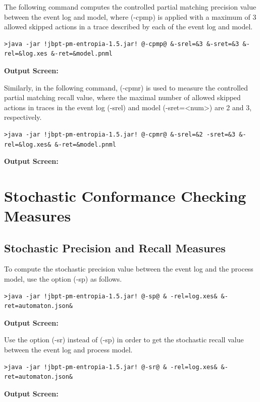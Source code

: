 \documentclass{article}
\begin{document}
The following command computes the controlled partial matching precision value between the event log and model, where (\textcolor{darkcandyapplered}{\footnotesize\ttfamily-cpmp}) is applied with a maximum of 3 allowed skipped actions in a trace described by each of the event log and model.
\begin{lstlisting}[style=CL]
>java -jar !jbpt-pm-entropia-1.5.jar! @-cpmp@ &-srel=&3 &-sret=&3 &-rel=&log.xes &-ret=&model.pnml
\end{lstlisting}
\textbf{Output Screen:}%


Similarly, in the following command, (\textcolor{darkcandyapplered}{\footnotesize\ttfamily-cpmr}) is used to measure the  controlled partial matching recall value, where the maximal number of allowed skipped actions in traces in the event log (\textcolor{ao}{\footnotesize\ttfamily-srel}) and model (\textcolor{ao}{\footnotesize\ttfamily-sret=<num>}) are 2 and 3, respectively.
\begin{lstlisting}[style=CL]
>java -jar !jbpt-pm-entropia-1.5.jar! @-cpmr@ &-srel=&2 -sret=&3 &-rel=&log.xes& &-ret=&model.pnml
\end{lstlisting}
\textbf{Output Screen:}%


\section*{Stochastic Conformance Checking Measures}
\setcounter{subsection}{0}
\subsection{Stochastic Precision and Recall Measures}
To compute the stochastic precision value between the event log and the process model, use the option (\textcolor{darkcandyapplered}{\footnotesize\ttfamily-sp}) as follows.
\begin{lstlisting}[style=CL]
>java -jar !jbpt-pm-entropia-1.5.jar! @-sp@ & -rel=log.xes& &-ret=automaton.json&
\end{lstlisting}
\textbf{Output Screen:}%


Use the option (\textcolor{darkcandyapplered}{\footnotesize\ttfamily-sr}) instead of (\textcolor{darkcandyapplered}{\footnotesize\ttfamily-sp}) in order to get the stochastic recall value between the event log and process model. 
\begin{lstlisting}[style=CL]
>java -jar !jbpt-pm-entropia-1.5.jar! @-sr@ & -rel=log.xes& &-ret=automaton.json&
\end{lstlisting}
\textbf{Output Screen:}%

\end{document}
